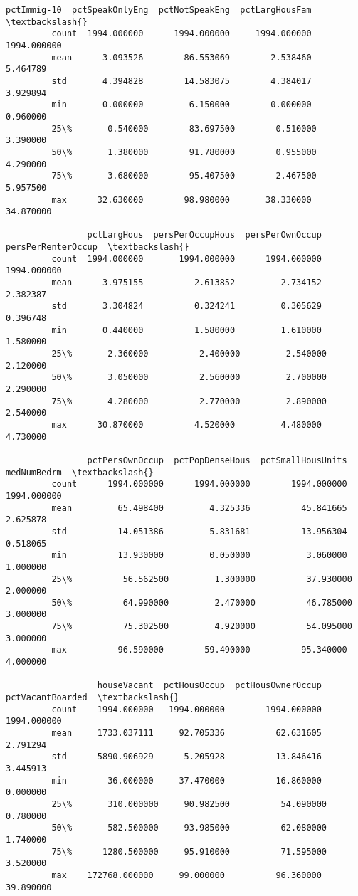 \documentclass[11pt]{llncs}
\begin{document}
\begin{Verbatim}[commandchars=\\\{\}]
                pctImmig-10  pctSpeakOnlyEng  pctNotSpeakEng  pctLargHousFam  \textbackslash{}
         count  1994.000000      1994.000000     1994.000000     1994.000000   
         mean      3.093526        86.553069        2.538460        5.464789   
         std       4.394828        14.583075        4.384017        3.929894   
         min       0.000000         6.150000        0.000000        0.960000   
         25\%       0.540000        83.697500        0.510000        3.390000   
         50\%       1.380000        91.780000        0.955000        4.290000   
         75\%       3.680000        95.407500        2.467500        5.957500   
         max      32.630000        98.980000       38.330000       34.870000   
         
                pctLargHous  persPerOccupHous  persPerOwnOccup  persPerRenterOccup  \textbackslash{}
         count  1994.000000       1994.000000      1994.000000         1994.000000   
         mean      3.975155          2.613852         2.734152            2.382387   
         std       3.304824          0.324241         0.305629            0.396748   
         min       0.440000          1.580000         1.610000            1.580000   
         25\%       2.360000          2.400000         2.540000            2.120000   
         50\%       3.050000          2.560000         2.700000            2.290000   
         75\%       4.280000          2.770000         2.890000            2.540000   
         max      30.870000          4.520000         4.480000            4.730000   
         
                pctPersOwnOccup  pctPopDenseHous  pctSmallHousUnits  medNumBedrm  \textbackslash{}
         count      1994.000000      1994.000000        1994.000000  1994.000000   
         mean         65.498400         4.325336          45.841665     2.625878   
         std          14.051386         5.831681          13.956304     0.518065   
         min          13.930000         0.050000           3.060000     1.000000   
         25\%          56.562500         1.300000          37.930000     2.000000   
         50\%          64.990000         2.470000          46.785000     3.000000   
         75\%          75.302500         4.920000          54.095000     3.000000   
         max          96.590000        59.490000          95.340000     4.000000   
         
                  houseVacant  pctHousOccup  pctHousOwnerOccup  pctVacantBoarded  \textbackslash{}
         count    1994.000000   1994.000000        1994.000000       1994.000000   
         mean     1733.037111     92.705336          62.631605          2.791294   
         std      5890.906929      5.205928          13.846416          3.445913   
         min        36.000000     37.470000          16.860000          0.000000   
         25\%       310.000000     90.982500          54.090000          0.780000   
         50\%       582.500000     93.985000          62.080000          1.740000   
         75\%      1280.500000     95.910000          71.595000          3.520000   
         max    172768.000000     99.000000          96.360000         39.890000   
         

\end{Verbatim}
\end{document}
